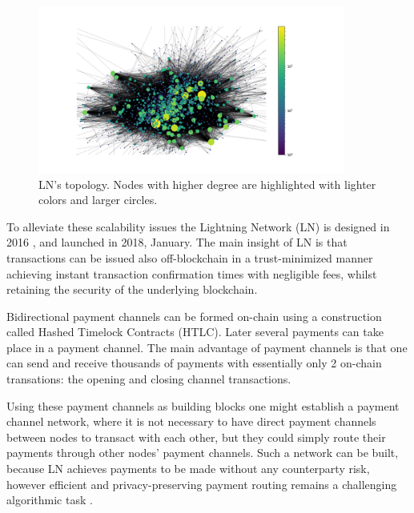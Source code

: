 \documentclass[a4paper]{article}
\theoremstyle{definition}
\begin{document}
\begin{figure}
	\captionsetup{justification=centering,margin=0.5cm}
	\begin{center}
		\includegraphics[width=0.9\textwidth]{LNtopology.png}
	\end{center}
	
	\caption{LN's topology. Nodes with higher degree are highlighted with lighter colors and larger circles.}\label{fig:lntopology}
	\vspace{-10pt}
\end{figure}

To alleviate these scalability issues the Lightning Network (LN) is designed in 2016 \cite{poon2016bitcoin}, and launched in 2018, January. The main insight of LN is that transactions can be issued also off-blockchain in a trust-minimized manner achieving instant transaction confirmation times with negligible fees, whilst retaining the security of the underlying blockchain. 

Bidirectional payment channels can be formed on-chain using a construction called Hashed Timelock Contracts (HTLC). Later several payments can take place in a payment channel. The main advantage of payment channels is that one can send and receive thousands of payments with essentially only 2 on-chain transations: the opening and closing channel transactions.

Using these payment channels as building blocks one might establish a payment channel network, where it is not necessary to have direct payment channels between nodes to transact with each other, but they could simply route their payments through other nodes' payment channels.
Such a network can be built, because LN achieves payments to be made without any counterparty risk, however efficient and privacy-preserving payment routing remains a challenging algorithmic task \cite{roos2017settling}.    
\end{document}
